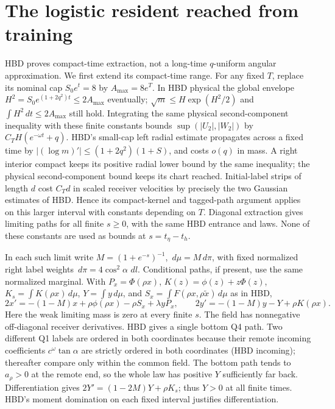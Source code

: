 \documentclass[11pt]{article}
\newcommand{\dd}{\,d}\newcommand{\E}{\mathbb E}
\begin{document}
\section{The logistic resident reached from training}
HBD proves compact-time extraction, not a long-time $q$-uniform
angular approximation. We first extend its compact-time range.
For any fixed $T$, replace its nominal cap $S_0e^t=8$ by
$A_{\max}= 8 e^T$. In HBD physical the global envelope
$H^2=S_0e^{(1+2q^2)t}\le 2A_{\max}$ eventually; $\sqrt m\le
H\exp(H^2/2)$ and $\int H^2\,dt\le2A_{\max}$ still hold.
Integrating the same physical second-component inequality with
these finite constants bounds $\sup(|U_2|,|W_2|)$ by
$C_T H(e^{-\omega t}+q)$. HBD's small-cap left radial estimate
propagates across a fixed time by $|(\log m)'|\le(1+2q^2)(1+S)$,
and costs $o(q)$ in mass. A right interior compact keeps its
positive radial lower bound by the same inequality; the physical
second-component bound keeps its chart reached. Initial-label strips
of length $d$ cost $C_Td$ in scaled receiver velocities by precisely
the two Gaussian estimates of HBD. Hence its compact-kernel and
tagged-path argument applies on this larger interval with constants
depending on $T$. Diagonal extraction gives limiting paths for all
finite $s\ge0$, with the same HBD entrance and laws. None of these
constants are used as bounds at $s=t_\eta-t_h$.

In each such limit write $M=(1+e^{-s})^{-1}$,
$\dd\mu=M\dd\pi$, with fixed normalized right label weights
$\dd\pi=4\cos^2\alpha\,\dd l$. Conditional paths, if present,
use the same normalized marginal. With $P_x=\Phi(\rho x)$,
$K(z)=\phi(z)+z\Phi(z)$, $K_s=\int K(\rho x)\dd\mu$,
$Y=\int y\dd\mu$, and
$S_x=\int F(\rho x,\rho\tilde x)\dd\mu$ as in HBD,
\begin{equation}\label{an04brwv1:field}
 2x'=-(1-M)x+\rho\phi(\rho x)-\rho S_x+\lambda yP_x,\qquad
 2y'=-(1-M)y-Y+\rho K(\rho x).
\end{equation}
Here the weak limiting mass is zero at every finite $s$. The field
has nonnegative off-diagonal receiver derivatives. HBD gives a
single bottom Q4 path. Two different Q1 labels are ordered in both
coordinates because their remote incoming coefficients
$c^\omega\tan\alpha$ are strictly ordered in both coordinates
(HBD incoming); thereafter compare only within the common field.
The bottom path tends to $a_\rho>0$ at the remote end, so the
whole law has positive $Y$ sufficiently far back. Differentiation
gives $2Y'=(1-2M)Y+\rho K_s$; thus $Y>0$ at all finite times.
HBD's moment domination on each fixed interval justifies differentiation.
\end{document}
